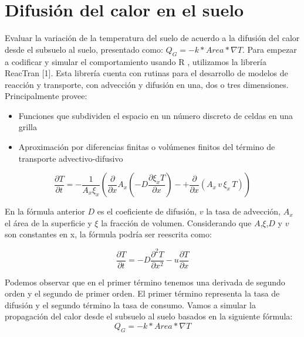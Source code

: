 \documentclass[final,a4paper]{llncs}
\begin{document}
\section{Difusión del calor en el suelo}
 Evaluar la variación de la temperatura del suelo de acuerdo a la difusión del calor desde el subsuelo al suelo,
 presentado como: $Q_G=-k* Area * \nabla T $. Para empezar a codificar y simular el comportamiento usando R , 
 utilizamos la librería ReacTran [1]. Esta librería cuenta con rutinas para el desarrollo de modelos de 
 reacción y transporte, con advección 
 y difusión en una, dos o tres dimensiones. Principalmente provee:
\begin{itemize}
\item Funciones que subdividen el espacio en un número discreto de celdas en una grilla
\item Aproximación por diferencias finitas o volúmenes finitos del término de transporte advectivo-difusivo
\end{itemize}

 $$ \frac{\partial T}{\partial t}
 = -\frac{1}{A_x\xi_x} \left( \frac{\partial}{\partial x} A_x
           ( -D \frac{\partial \xi_x T}{\partial x} ) - 
            + \frac{\partial}{\partial x} (A_x\, v\,  \xi_x\, T) \right) $$

En la fórmula anterior $D$ es el coeficiente de difusión, $v$ la tasa de advección, $A_x$ el área de la superficie y
$\xi$ la fracción de volumen. Considerando que $A$,$\xi$,$D$ y $v$ son constantes en x, la fórmula podría ser reescrita como:

 $$ \frac{\partial T}{\partial t} =  -D \frac{\partial^2 T}{\partial x^2}  - u
            \frac{\partial T}{\partial x}  $$

 Podemos observar que en el primer término tenemos una derivada de segundo orden y el segundo de primer orden. El
 primer término representa la tasa de difusión y el segundo término la tasa de consumo.
 Vamos a simular la propagación del calor desde el subsuelo al suelo basados en la siguiente fórmula:
 $$Q_G=-k* Area * \nabla T$$


\end{document}

